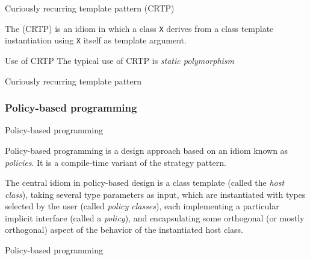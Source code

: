\begin{frame}{Curiously recurring template pattern (CRTP)}{}
  \begin{definition}
    The  (CRTP) is an idiom in which a class \lstinline!X! derives from a class template instantiation using \lstinline!X! itself as template argument.
  \end{definition}

  \begin{block}{Use of CRTP}
    The typical use of CRTP is \emph{static polymorphism}
  \end{block}
\end{frame}

\begin{frame}{Curiously recurring template pattern}{}
  \begin{example}
  \end{example}
\end{frame}

\subsubsection{Policy-based programming}

\begin{frame}{Policy-based programming}{}
  \begin{block}{Policy-based programming}
     is a design approach based on an idiom known as \emph{policies}. It is a compile-time variant of the strategy pattern.

    The central idiom in policy-based design is a class template (called the \emph{host class}), taking several type parameters as input, which are instantiated with types selected by the user (called \emph{policy classes}), each implementing a particular implicit interface (called a \emph{policy}), and encapsulating some orthogonal (or mostly orthogonal) aspect of the behavior of the instantiated host class.
  \end{block}
\end{frame}

\begin{frame}{Policy-based programming}{}
  \begin{example}
  \end{example}
\end{frame}
